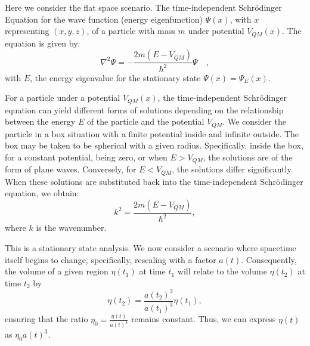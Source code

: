 \documentclass[sn-mathphys-num]{sn-jnl}%
\begin{document}
Here we consider the flat space scenario. The time-independent Schr{\"o}dinger Equation for the wave function (energy eigenfunction) $\Psi(x)$, with $x$ representing $(x,y,z)$, of a particle with mass $m$ under potential $V_{QM}(x)$. The equation is given by:
\begin{equation}
\nabla^2 \Psi = -\frac{2m(E - V_{QM})}{\hbar^2} \Psi \quad, \label{eq1Schrodinger}
\end{equation}
with $E$, the energy eigenvalue for the stationary state $\Psi(x)=\Psi_{E}(x)$.

For a particle under a potential $V_{QM}(x)$, the time-independent Schr{\"o}dinger equation can yield different forms of solutions depending on the relationship between the energy $E$ of the particle and the potential $V_{QM}$. We consider the particle in a box situation with a finite potential inside and infinite outside. The box may be taken to be spherical with a given radius. Specifically, inside the box, for a constant potential, being zero, or when $E > V_{QM}$, the solutions are of the form of plane waves. Conversely, for $E < V_{QM}$, the solutions differ significantly. When these solutions are substituted back into the time-independent Schr{\"o}dinger equation, we obtain:
\begin{equation}
k^2 = \frac{2m(E-V_{QM})}{\hbar^2}, \label{eq2KEV}
\end{equation}
where $k$ is the wavenumber. 


This is a stationary state analysis. We now consider a scenario where spacetime itself begins to change, specifically, rescaling with a factor $a(t)$. Consequently, the volume of a given region $\eta(t_1)$ at time $t_1$ will relate to the volume $\eta(t_2)$ at time $t_2$ by
\begin{equation}
\eta(t_2) = \frac{a(t_2)^3}{a(t_1)^3}\eta(t_1), \label{eq:VolumeScale}
\end{equation}
ensuring that the ratio $\eta_0 = \frac{\eta(t)}{a(t)^3}$ remains constant. Thus, we can express $\eta(t)$ as $\eta_0 a(t)^3$.
\end{document}
